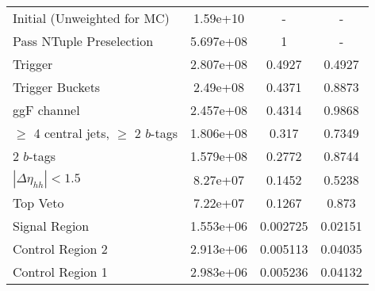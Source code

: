\begin{table}
{\begin{tabular}{lccc}
\midrule
Initial (Unweighted for MC)            &  1.59e+10 &                      - &                  - \\
Pass NTuple Preselection               & 5.697e+08 &                      1 &                  - \\
Trigger                                & 2.807e+08 &                 0.4927 &             0.4927 \\
Trigger Buckets                        &  2.49e+08 &                 0.4371 &             0.8873 \\
ggF channel                            & 2.457e+08 &                 0.4314 &             0.9868 \\
$\ge$ 4 central jets, $\ge$ 2 $b$-tags & 1.806e+08 &                  0.317 &             0.7349 \\
2 $b$-tags                             & 1.579e+08 &                 0.2772 &             0.8744 \\
$|\Delta\eta_{hh}| < 1.5$              &  8.27e+07 &                 0.1452 &             0.5238 \\
Top Veto                               &  7.22e+07 &                 0.1267 &              0.873 \\
Signal Region                          & 1.553e+06 &               0.002725 &            0.02151 \\
Control Region 2                       & 2.913e+06 &               0.005113 &            0.04035 \\
Control Region 1                       & 2.983e+06 &               0.005236 &            0.04132 \\
\bottomrule
\end{tabular}
} \ 
\end{table}
